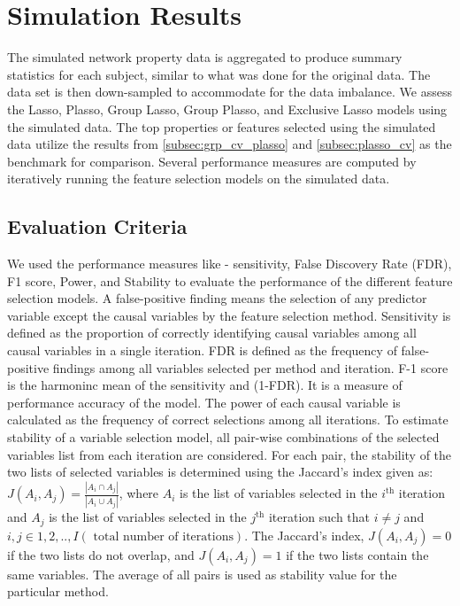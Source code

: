 \section{Simulation Results}\label{sec:simresults}
The simulated network property data is aggregated to produce summary statistics for each subject, similar to what was done for the original data. The data set is then down-sampled to accommodate for the data imbalance. We assess the Lasso, Plasso, Group Lasso, Group Plasso, and Exclusive Lasso models using the simulated data. The top properties or features selected using the simulated data utilize the results from \autoref{subsec:grp_cv_plasso} and \autoref{subsec:plasso_cv} as the benchmark for comparison. Several performance measures are computed by iteratively running the feature selection models on the simulated data.\par

\subsection{Evaluation Criteria} \label{subsec:evalcrt}
We used the performance measures like - sensitivity, False Discovery Rate (FDR), F1 score, Power, and Stability to evaluate the
performance of the different feature selection models. A false-positive finding means the selection of any predictor variable except the causal variables by the feature selection method. Sensitivity is defined as the proportion of correctly identifying causal variables among all causal variables in a single iteration. FDR is defined as the frequency of false-positive findings among all variables selected per method and
iteration. F-1 score is the harmoninc mean of the sensitivity and (1-FDR). It is a measure of performance accuracy of the model. The power of each causal variable is calculated as the frequency of correct selections among all iterations. To estimate stability of a variable selection model, all pair-wise combinations of the selected variables list from each iteration are considered. For each pair, the stability of the two lists of selected variables is determined using the Jaccard’s index given as: $J(A_i,A_j)=\frac{|A_i\cap A_j|}{|A_i\cup A_j|}$, where $A_i$ is the list of variables selected in the $i^{\text{th}}$ iteration and $A_j$ is the list of variables selected in the $j^{\text{th}}$ iteration such that $i\ne j$ and $i,j\in 1,2,..,I (\text{ total number of iterations})$. The Jaccard's index, $J(A_i,A_j)=0$ if the two lists do not overlap, and $J(A_i,A_j)=1$ if the two lists contain the same variables. The average of all pairs is used as stability value for the particular method.

